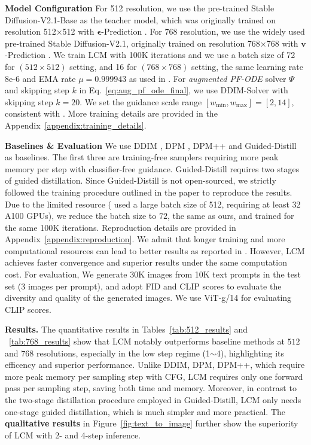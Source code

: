 \documentclass{article} %
\begin{document}
\noindent \textbf{Model Configuration} For 512 resolution, we use the pre-trained Stable Diffusion-V2.1-Base \citep{rombach2022high} as the teacher model, which was originally trained on resolution 512$\times$512 with $\boldsymbol{\epsilon}$-Prediction \citep{ho2020denoising}. For 768 resolution, we use the widely used pre-trained Stable Diffusion-V2.1, originally trained on resolution 768$\times$768 with $\boldsymbol{v}$-Prediction \citep{salimans2022progressive}. We train LCM with 100K iterations and we use a batch size of 72 for $(512\times512)$ setting, and 16 for $(768\times768)$ setting, the same learning rate 8e-6 and EMA rate $\mu=0.999943$ as used in \citep{song2023consistency}. For {\em augmented PF-ODE} solver $\Psi$ and skipping step $k$ in Eq.~\ref{eq:aug_pf_ode_final}, we use DDIM-Solver \citep{song2020denoising} with skipping step $k=20$. We set the guidance scale range $[w_{\text{min}},w_{\text{max}}] = [2, 14]$, consistent with \citep{meng2023distillation}. More training details are provided in the Appendix~\ref{appendix:training_details}.

\noindent \textbf{Baselines \& Evaluation} We use DDIM \citep{song2020denoising}, DPM \citep{lu2022dpm}, DPM++ \citep{lu2022dpm++} and Guided-Distill \citep{meng2023distillation} as baselines. The first three are training-free samplers requiring more peak memory per step with classifier-free guidance. Guided-Distill requires two stages of guided distillation. Since Guided-Distill is not open-sourced, we strictly followed the training procedure outlined in the paper to reproduce the results. Due to the limited resource (\cite{meng2023distillation} used a large batch size of 512, requiring at least 32 A100 GPUs), we reduce the batch size to $72$, the same as ours, and trained for the same 100K iterations. Reproduction details are provided in Appendix~\ref{appendix:reproduction}. We admit that longer training and more computational resources can lead to better results as reported in \citep{meng2023distillation}. However, LCM achieves faster convergence and superior results under the same computation cost. For evaluation, 
We generate 30K images from 10K text prompts in the test set (3 images per prompt), and
adopt FID and CLIP scores to evaluate the diversity and quality
of the generated images. We use ViT-g/14 for evaluating CLIP scores. 

\noindent \textbf{Results.} The quantitative results in Tables~\ref{tab:512_results} and ~\ref{tab:768_results} show that LCM notably outperforms baseline methods at $512$ and $768$ resolutions, especially in the low step regime (1$\sim$4), highlighting its efficency and superior performance. Unlike DDIM, DPM, DPM++, which require more peak memory per sampling step with CFG, LCM requires only one forward pass per sampling step, saving both time and memory. Moreover, in contrast to the two-stage distillation procedure employed in Guided-Distill, LCM only needs one-stage guided distillation, which is much simpler and more practical. 
The \textbf{qualitative results} in Figure~\ref{fig:text_to_image} further show
the superiority of LCM with 2- and 4-step inference.
\end{document}
